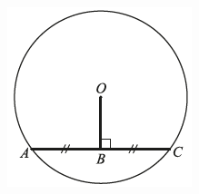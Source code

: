 \documentclass[12pt]{article}
\begin{document}
\begin{figure}[h!]
	\centering
	\includegraphics[height=0.15\textheight]{Graphics/Week_13/MidBisectChord.png}
\end{figure}

\newpage

\newcommand{\spacing}{\\ \\ \\ \\ \\ \\ \\ \\ \\}
\end{document}
